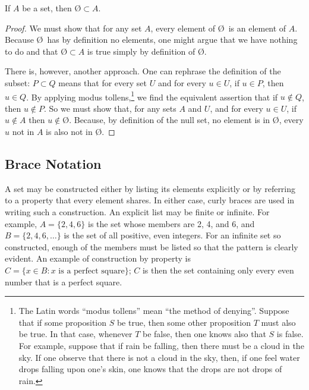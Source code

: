 \begin{theorem}
   If $A$ be a set, then $\text{\O} \subset A$.
   \begin{proof}
      We must show that for any set $A$, every element of \O\ is an element of
      $A$. Because \O\ has by definition no elements, one might argue that we
      have nothing to do and that $\text{\O} \subset A$ is true simply by
      definition of \O.
      
      There is, however, another approach. One can rephrase the definition of
      the subset: $P \subset Q$ means that for every set $U$ and for every $u
      \in U$, if $u \in P$, then $u \in Q$. By applying modus
      tollens,\footnote{%
         The Latin words ``modus tollens'' mean ``the method of denying''.
         Suppose that if some proposition $S$ be true, then some other
         proposition $T$ must also be true. In that case, whenever $T$ be
         false, then one knows also that $S$ is false. For example, suppose
         that if rain be falling, then there must be a cloud in the sky. If one
         observe that there is not a cloud in the sky, then, if one feel water
         drops falling upon one's skin, one knows that the drops are not drops
         of rain.
      }
      we find the equivalent assertion that if $u \notin Q$, then $u \notin P$.
      So we must show that, for any sets $A$ and $U$, and for every $u \in U$,
      if $u \notin A$ then $u \notin \text{\O}$.  Because, by definition of the
      null set, no element is in \O, every $u$ not in $A$ is also not in \O.
   \end{proof}
\end{theorem}

\subsection{Brace Notation}

A set may be constructed either by listing its elements explicitly or by
referring to a property that every element shares. In either case, curly braces
are used in writing such a construction. An explicit list may be finite or
infinite. For example, $A = \{2, 4, 6\}$ is the set whose members are 2, 4, and
6, and $B = \{2, 4, 6, \ldots\}$ is the set of all positive, even integers. For
an infinite set so constructed, enough of the members must be listed so that
the pattern is clearly evident. An example of construction by property is $C =
\{x \in B: \text{$x$ is a perfect square}\}$; $C$ is then the set containing
only every even number that is a perfect square.

